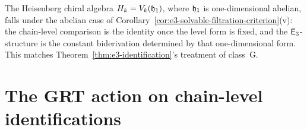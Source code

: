 \begin{remark}
\label{rem:heisenberg-solvable-special-case}
The Heisenberg chiral algebra $H_k = V_k(\mathfrak{h}_1)$, where
$\mathfrak{h}_1$ is one-dimensional abelian, falls under the abelian
case of
Corollary~\ref{cor:e3-solvable-filtration-criterion}(v): the
chain-level comparison is the identity once the level form is fixed,
and the $\mathsf{E}_3$-structure is the constant biderivation determined
by that one-dimensional form.
This matches Theorem~\ref{thm:e3-identification}'s treatment
of class~G.
\end{remark}

\section{The GRT action on chain-level identifications}
\label{sec:grt1-action}

